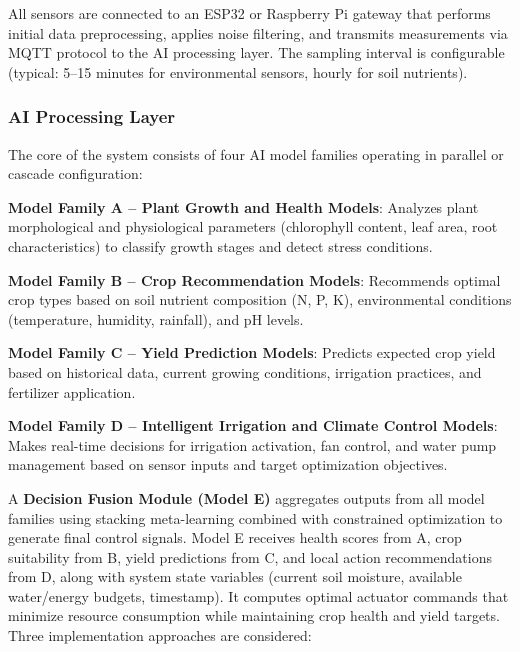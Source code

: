\documentclass[conference]{IEEEtran}
\begin{document}
All sensors are connected to an ESP32 or Raspberry Pi gateway that performs initial data preprocessing, applies noise filtering, and transmits measurements via MQTT protocol to the AI processing layer. The sampling interval is configurable (typical: 5--15 minutes for environmental sensors, hourly for soil nutrients).

\subsubsection{AI Processing Layer}
The core of the system consists of four AI model families operating in parallel or cascade configuration:

\textbf{Model Family A -- Plant Growth and Health Models}: Analyzes plant morphological and physiological parameters (chlorophyll content, leaf area, root characteristics) to classify growth stages and detect stress conditions.

\textbf{Model Family B -- Crop Recommendation Models}: Recommends optimal crop types based on soil nutrient composition (N, P, K), environmental conditions (temperature, humidity, rainfall), and pH levels.

\textbf{Model Family C -- Yield Prediction Models}: Predicts expected crop yield based on historical data, current growing conditions, irrigation practices, and fertilizer application.

\textbf{Model Family D -- Intelligent Irrigation and Climate Control Models}: Makes real-time decisions for irrigation activation, fan control, and water pump management based on sensor inputs and target optimization objectives.

A \textbf{Decision Fusion Module (Model E)} aggregates outputs from all model families using stacking meta-learning combined with constrained optimization to generate final control signals. Model E receives health scores from A, crop suitability from B, yield predictions from C, and local action recommendations from D, along with system state variables (current soil moisture, available water/energy budgets, timestamp). It computes optimal actuator commands that minimize resource consumption while maintaining crop health and yield targets. Three implementation approaches are considered:
\end{document}
